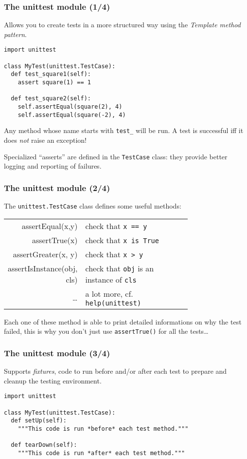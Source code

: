 \begin{frame}[fragile]\frametitle{The unittest module (1/4)}
  Allows you to create tests in a more structured way using the
  \textit{Template method pattern}.

  \begin{lstlisting}
import unittest

class MyTest(unittest.TestCase):
  def test_square1(self):
    assert square(1) == 1

  def test_square2(self):
    self.assertEqual(square(2), 4)
    self.assertEqual(square(-2), 4)
  \end{lstlisting}

Any method whose name starts with \texttt{test\_} will be run.
A test is successful iff it does \emph{not} raise an exception!

Specialized ``asserts'' are defined in the \texttt{TestCase}
class: they provide better logging and reporting of failures.
\end{frame}

\begin{frame}[fragile]\frametitle{The unittest module (2/4)}

  The \texttt{unittest.TestCase} class defines some useful methods:
  
  
  \begin{tabular}{r | p{0.75\linewidth}}
  assertEqual(x,y)           & check that \texttt{x == y} \\
  assertTrue(x)              & check that \texttt{x is True} \\
  assertGreater(x, y)        & check that \texttt{x > y} \\
  assertIsInstance(obj, cls) & check that \texttt{obj} is an instance of \texttt{cls} \\
  \ldots                     & a lot more, cf. \texttt{help(unittest)}
  \end{tabular}

  Each one of these method is able to print detailed informations on
  why the test failed, this is why you don't just use
  \texttt{assertTrue()} for all the tests\ldots
\end{frame}

\begin{frame}[fragile]\frametitle{The unittest module (3/4)}
  Supports \textit{fixtures}, code to run before and/or after each
  test to prepare and cleanup the testing environment.

  \begin{lstlisting}
import unittest

class MyTest(unittest.TestCase):
  def setUp(self):
    """This code is run *before* each test method."""

  def tearDown(self):
    """This code is run *after* each test method."""
  \end{lstlisting}
\end{frame}


